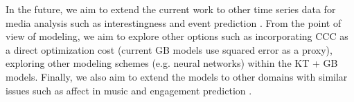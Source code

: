 \documentclass{article}
\begin{document}
\begin{spacing}{0.9}
In the future, we aim to extend the current work to other time series data for media analysis such as interestingness \cite{chen2011violence} and event prediction \cite{butterfield2012interestingness}. 
From the point of view of modeling, we aim to explore other options such as incorporating CCC as a direct optimization cost (current GB models use squared error as a proxy), exploring other modeling schemes (e.g. neural networks) within the KT + GB models.
Finally, we also aim to extend the models to other domains with similar issues such as affect in music \cite{broekens2010real} and engagement prediction \cite{gupta2016analysis}. 
\end{spacing}

{
\begin{spacing}{.95 }


\end{spacing}
}
\end{document}
